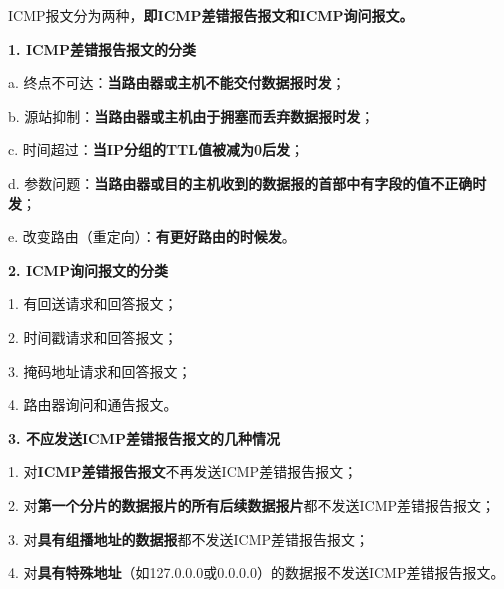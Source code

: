 ICMP报文分为两种，\textbf{即ICMP差错报告报文和ICMP询问报文。}

\textbf{{1. ICMP差错报告报文的分类}}

a. 终点不可达：\textbf{当路由器或主机不能交付数据报时发}；

b. 源站抑制：\textbf{当路由器或主机由于拥塞而丢弃数据报时发}；

c. 时间超过：\textbf{当IP分组的TTL值被减为0后发}；

d.
参数问题：\textbf{当路由器或目的主机收到的数据报的首部中有字段的值不正确时发}；

e. 改变路由（重定向）：\textbf{有更好路由的时候发}。

\textbf{{2. ICMP询问报文的分类}}

1. 有回送请求和回答报文；

2. 时间戳请求和回答报文；

3. 掩码地址请求和回答报文；

4. 路由器询问和通告报文。

\textbf{{3. 不应发送ICMP差错报告报文的几种情况}}

1. 对\textbf{ICMP差错报告报文}不再发送ICMP差错报告报文；

2.
对\textbf{第一个分片的数据报片的所有后续数据报片}都不发送ICMP差错报告报文；

3. 对\textbf{具有组播地址的数据报}都不发送ICMP差错报告报文；

4.
对\textbf{具有特殊地址}（如127.0.0.0或0.0.0.0）的数据报不发送ICMP差错报告报文。
